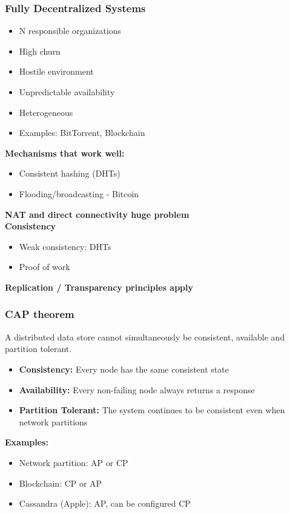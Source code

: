\subsubsection{Fully Decentralized Systems}
\begin{itemize}
    \item N responsible organizations
    \item High churn
    \item Hostile environment
    \item Unpredictable availability
    \item Heterogeneous
    \item Examples: BitTorrent, Blockchain
\end{itemize}
\textbf{Mechanisms that work well:}
\begin{itemize}
    \item Consistent hashing (DHTs)
    \item Flooding/broadcasting - Bitcoin
\end{itemize}
\textbf{NAT and direct connectivity huge problem}\\
\textbf{Consistency}
\begin{itemize}
    \item Weak consistency: DHTs
    \item Proof of work
\end{itemize}
\textbf{Replication / Transparency principles apply}

\subsubsection{CAP theorem}
A distributed data store cannot simultaneously be consistent, available and partition tolerant.
\begin{itemize}
    \item \textbf{Consistency:} Every node has the same consistent state
    \item \textbf{Availability:} Every non-failing node always returns a response
    \item \textbf{Partition Tolerant:} The system continues to be consistent even when network partitions
\end{itemize}
\textbf{Examples:}
\begin{itemize}
    \item Network partition: AP or CP
    \item Blockchain: CP or AP
    \item Cassandra (Apple): AP, can be configured CP
\end{itemize}

